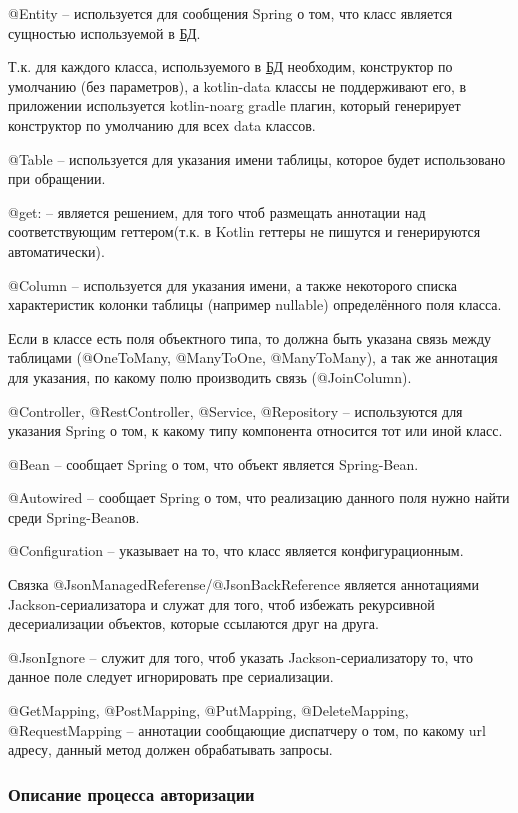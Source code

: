 @Entity – используется для сообщения Spring о том, что класс является сущностью используемой в \hyperlink{gloss:db}{БД}.

Т.к. для каждого класса, используемого в \hyperlink{gloss:db}{БД} необходим, конструктор по умолчанию (без параметров), 
а kotlin-data классы не поддерживают его, в приложении используется kotlin-noarg gradle плагин, который генерирует конструктор по умолчанию для всех data классов.

@Table – используется для указания имени таблицы, которое будет использовано при обращении.

@get: – является решением, для того чтоб размещать аннотации над соответствующим геттером(т.к. в Kotlin геттеры не пишутся и генерируются автоматически).

@Column – используется для указания имени, а также некоторого списка характеристик колонки таблицы (например nullable) определённого поля класса.

Если в классе есть поля объектного типа, то должна быть указана связь между таблицами (@OneToMany, @ManyToOne, @ManyToMany), 
а так же аннотация для указания, по какому полю производить связь (@JoinColumn).

@Controller, @RestController, @Service, @Repository – используются для указания Spring о том, к какому типу компонента относится тот или иной класс.

@Bean – сообщает Spring о том, что объект является Spring-Bean.

@Autowired – сообщает Spring о том, что реализацию данного поля нужно найти среди Spring-Beanов.

@Configuration – указывает на то, что класс является конфигурационным.

Связка @JsonManagedReferense/@JsonBackReference является аннотациями Jackson-сериализатора и служат для того, 
чтоб избежать рекурсивной десериализации объектов, которые ссылаются друг на друга.

@JsonIgnore – служит для того, чтоб указать Jackson-сериализатору то, что данное поле следует игнорировать пре сериализации.

@GetMapping, @PostMapping, @PutMapping, @DeleteMapping, @RequestMapping – аннотации сообщающие диспатчеру о том, по какому url адресу, данный метод должен обрабатывать запросы.

\subsubsection{Описание процесса авторизации}\indent

